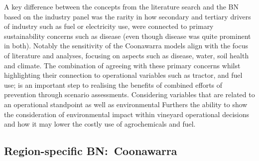 \documentclass[fleqn,10pt]{wlscirep}
\begin{document}
A key difference between the concepts from the literature search and the BN based on the industry panel was the rarity in how secondary and tertiary drivers of industry such as fuel or electricity use, were connected to primary sustainability concerns such as disease (even though disease was quite prominent in both). Notably the sensitivity of the Coonawarra models align with the focus of literature and analyses, focusing on  aspects such as disease, water, soil health and climate. The combination of agreeing with these primary concerns whilst highlighting their connection to operational variables such as tractor, and fuel use; is an important step to realising the benefits of combined efforts of prevention through scenario assessments. Considering variables that are related to an operational standpoint as well as environmental Furthers the ability to show the consideration of environmental impact within vineyard operational decisions and how it may lower the costly use of agrochemicals and fuel.


\subsection*{Region-specific BN:~Coonawarra}
\end{document}

